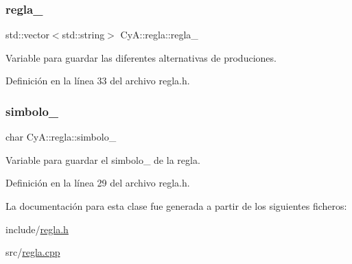 \subsubsection{\texorpdfstring{regla\+\_\+}{regla\_}}
{\footnotesize\ttfamily std\+::vector$<$std\+::string$>$ Cy\+A\+::regla\+::regla\+\_\+}



Variable para guardar las diferentes alternativas de produciones. 



Definición en la línea 33 del archivo regla.\+h.

\mbox{\label{class_cy_a_1_1regla_acee8a4eb2a2905af6dd1c3236261d1cc}} 
\subsubsection{\texorpdfstring{simbolo\+\_\+}{simbolo\_}}
{\footnotesize\ttfamily char Cy\+A\+::regla\+::simbolo\+\_\+}



Variable para guardar el simbolo\+\_\+ de la regla. 



Definición en la línea 29 del archivo regla.\+h.



La documentación para esta clase fue generada a partir de los siguientes ficheros\+:\begin{DoxyCompactItemize}
\item 
include/\mbox{\hyperlink{regla_8h}{regla.\+h}}\item 
src/\mbox{\hyperlink{regla_8cpp}{regla.\+cpp}}\end{DoxyCompactItemize}
